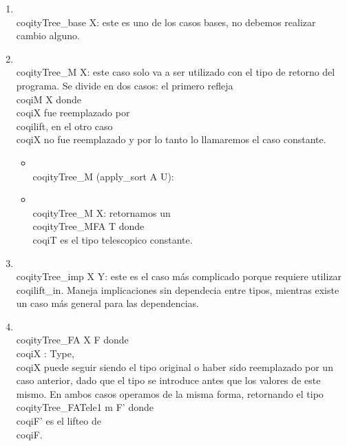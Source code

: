 \begin{enumerate}
\item \\coqi{tyTree_base X}: este es uno de los casos bases, no debemos realizar
  cambio alguno.
\item \\coqi{tyTree_M X}: este caso solo va a ser utilizado con el tipo de
  retorno del programa. Se divide en dos casos: el primero refleja \\coqi{M X}
  donde \\coqi{X} fue reemplazado por \\coqi{lift}, en el otro caso \\coqi{X} no
  fue reemplazado y por lo tanto lo llamaremos el caso constante.
  \begin{itemize}
  \item \\coqi{tyTree_M (apply_sort A U)}: 
  \item \\coqi{tyTree_M X}: retornamos un \\coqi{tyTree_MFA T} donde \\coqi{T} es
    el tipo telescopico constante.
  \end{itemize}
\item \\coqi{tyTree_imp X Y}: este es el caso más complicado porque requiere utilizar
  \\coqi{lift_in}. Maneja implicaciones sin dependecia entre tipos, mientras
  existe un caso más general para las dependencias.
\item \\coqi{tyTree_FA X F} donde \\coqi{X : Type}, \\coqi{X} puede seguir siendo el
  tipo original o haber sido reemplazado por un caso anterior, dado que el tipo
  se introduce antes que los valores de este mismo. En ambos casos operamos de
  la misma forma, retornando el tipo \\coqi{tyTree_FATele1 m F'} donde \\coqi{F'}
  es el lifteo de \\coqi{F}.

\end{enumerate}
